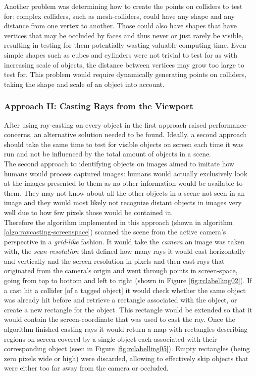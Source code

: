 Another problem was determining how to create the points on colliders to test for: complex colliders, such as mesh-colliders, could have any shape and any distance from one vertex to another. Those could also have shapes that have vertices that may be occluded by faces and thus never or just rarely be visible, resulting in testing for them potentially wasting valuable computing time. Even simple shapes such as cubes and cylinders were not trivial to test for as with increasing scale of objects, the distance between vertices may grow too large to test for. This problem would require dynamically generating points on colliders, taking the shape and scale of an object into account.

\subsubsection{Approach II: Casting Rays from the Viewport}
After using ray-casting on every object in the first approach raised performance-concerns, an alternative solution needed to be found. Ideally, a second approach should take the same time to test for visible objects on screen each time it was run and not be influenced by the total amount of objects in a scene.\\
The second approach to identifying objects on images aimed to imitate how humans would process captured images: humans would actually exclusively look at the images presented to them as no other information would be available to them. They may not know about all the other objects in a scene not seen in an image and they would most likely not recognize distant objects in images very well due to how few pixels those would be contained in.\\
Therefore the algorithm implemented in this approach (shown in algorithm \ref{algo:raycasting-screenspace}) scanned the scene from the active camera's perspective in a \textit{grid-like} fashion. It would take the \textit{camera} an image was taken with, the \textit{scan-resolution} that defined how many rays it would cast horizontally and vertically and the screen-resolution in pixels and then cast rays that originated from the camera's origin and went through points in screen-space, going from top to bottom and left to right (shown in Figure \ref{fig:rclabelling02}). If a cast hit a collider [of a tagged object] it would check whether the same object was already hit before and retrieve a rectangle associated with the object, or create a new rectangle for the object. This rectangle would be extended so that it would contain the screen-coordinate that was used to cast the ray. Once the algorithm finished casting rays it would return a map with rectangles describing regions on screen covered by a single object each associated with their corresponding object (seen in Figure \ref{fig:rclabelling05}). Empty rectangles (being zero pixels wide or high) were discarded, allowing to effectively skip objects that were either too far away from the camera or occluded.\\
